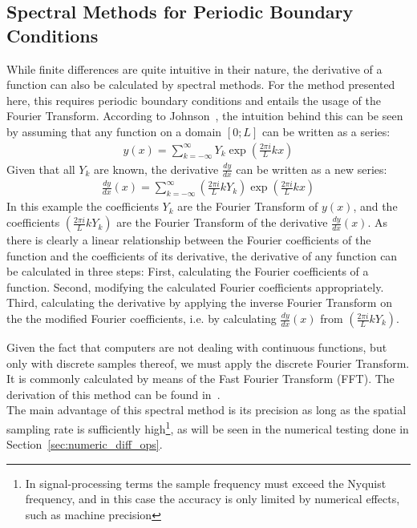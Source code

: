 \subsection{Spectral Methods for Periodic Boundary Conditions}
While finite differences are quite intuitive in their nature, the derivative of a function can also be calculated by spectral methods.
For the method presented here, this requires periodic boundary conditions and entails the usage of the Fourier Transform.
According to Johnson~\cite{johnson2011notes}, the intuition behind this can be seen by assuming that any function on a domain $[0;L]$ can be written as a series:
\begin{align*}
y(x) = \sum_{k=-\infty}^{\infty}Y_k\exp \left(\frac{2\pi i}{L}kx\right)
\end{align*}
Given that all $Y_k$ are known, the derivative $\frac{dy}{dx}$ can be written as a new series:
\begin{align*}
\frac{dy}{dx}(x) = \sum_{k=-\infty}^{\infty}\left(\frac{2\pi i}{L}kY_k\right)\exp \left(\frac{2\pi i}{L}kx\right)
\end{align*}
In this example the coefficients $Y_k$ are the Fourier Transform of $y(x)$, and the coefficients $(\frac{2\pi i}{L}kY_k)$ are the Fourier Transform of the derivative $\frac{dy}{dx}(x)$.
As there is clearly a linear relationship between the Fourier coefficients of the function and the coefficients of its derivative, the derivative of any function can be calculated in three steps:
First, calculating the Fourier coefficients of a function.
Second, modifying the calculated Fourier coefficients appropriately.
Third, calculating the derivative by applying the inverse Fourier Transform on the the modified Fourier coefficients, i.e. by calculating $\frac{dy}{dx}(x)$ from $(\frac{2\pi i}{L}kY_k)$.

Given the fact that computers are not dealing with continuous functions, but only with discrete samples thereof, we must apply the discrete Fourier Transform.
It is commonly calculated by means of the Fast Fourier Transform (FFT).
The derivation of this method can be found in~\cite{johnson2011notes}.
\\

The main advantage of this spectral method is its precision as long as the spatial sampling rate is sufficiently high\footnote{In signal-processing terms the sample frequency must exceed the Nyquist frequency, and in this case the accuracy is only limited by numerical effects, such as machine precision}, as will be seen in the numerical testing done in Section~\ref{sec:numeric_diff_ops}.

